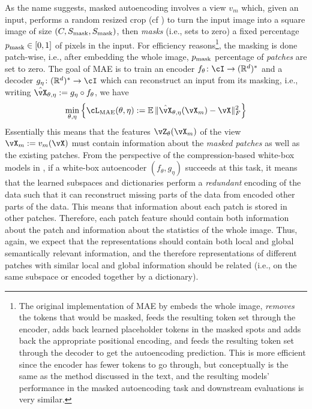 \documentclass[../../book-main.tex]{subfiles}
\begin{document}
As the name suggests, masked autoencoding involves a view \(v_{m}\) which, given an input, performs a random resized crop (cf ) to turn the input image into a square image of size \((C, S_{\mathrm{mask}}, S_{\mathrm{mask}})\), then \textit{masks} (i.e., sets to zero) a fixed percentage \(p_{\mathrm{mask}} \in [0, 1]\) of pixels in the input. For efficiency reasons\footnote{The original implementation of MAE by \cite{he2022masked} embeds the whole image, \textit{removes} the tokens that would be masked, feeds the resulting token set through the encoder, adds back learned placeholder tokens in the masked spots and adds back the appropriate positional encoding, and feeds the resulting token set through the decoder to get the autoencoding prediction. This is more efficient since the encoder has fewer tokens to go through, but conceptually is the same as the method discussed in the text, and the resulting models' performance in the masked autoencoding task and downstream evaluations is very similar.}, the masking is done patch-wise, i.e.,  after embedding the whole image, \(p_{\mathrm{mask}}\) percentage of \textit{patches} are set to zero. The goal of MAE is to train an encoder \(f_{\theta} \colon \cI \to (\R^{d})^{*}\) and a decoder \(g_{\eta} \colon (\R^{d})^{*} \to \cI\) which can reconstruct an input from its masking, i.e., writing \(\hat{\vX}_{\theta, \eta} := g_{\eta} \circ f_{\theta}\), we have
\begin{equation}
    \min_{\theta, \eta}\bc{\cL_{\mathrm{MAE}}(\theta, \eta) := \Ex\norm{\hat{\vX}_{\theta, \eta}(\vX_{m}) - \vX}_{F}^{2}}
\end{equation}
Essentially this means that the features \(\vZ_{\theta}(\vX_{m})\) of the view \(\vX_{m} := v_{m}(\vX)\) must contain information about the \textit{masked patches} as well as the existing patches. From the perspective of the compression-based white-box models in , if a white-box autoencoder  \((f_{\theta}, g_{\eta})\) succeeds at this task, it means that the learned subspaces and dictionaries perform a \textit{redundant} encoding of the data such that it can reconstruct missing parts of the data from encoded other parts of the data. This means that information about each patch is stored in other patches. Therefore, each patch feature should contain both information about the patch and information about the statistics of the whole image. Thus, again, we expect that the representations should contain both local and global semantically relevant information, and the therefore representations of different patches with similar local and global information should be related (i.e., on the same subspace or encoded together by a dictionary).
\end{document}
